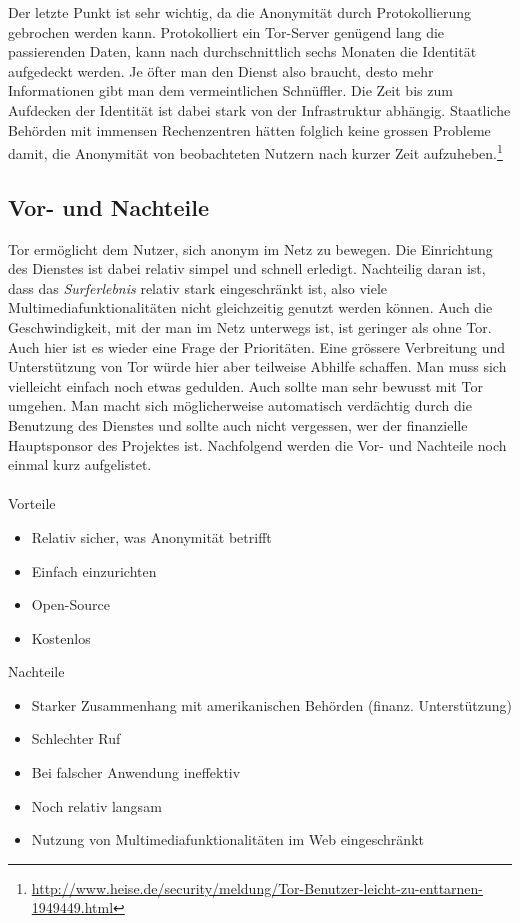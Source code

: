 Der letzte Punkt ist sehr wichtig, da die Anonymität durch Protokollierung gebrochen werden kann. Protokolliert ein Tor-Server genügend lang die passierenden Daten, kann nach durchschnittlich sechs Monaten die Identität aufgedeckt werden. Je öfter man den Dienst also braucht, desto mehr Informationen gibt man dem vermeintlichen Schnüffler. Die Zeit bis zum Aufdecken der Identität ist dabei stark von der Infrastruktur abhängig. Staatliche Behörden mit immensen Rechenzentren hätten folglich keine grossen Probleme damit, die Anonymität von beobachteten Nutzern nach kurzer Zeit aufzuheben.\footnote{\url{http://www.heise.de/security/meldung/Tor-Benutzer-leicht-zu-enttarnen-1949449.html}}

\subsection{Vor- und Nachteile}
Tor ermöglicht dem Nutzer, sich anonym im Netz zu bewegen. Die Einrichtung des Dienstes ist dabei relativ simpel und schnell erledigt. Nachteilig daran ist, dass das \textit{Surferlebnis} relativ stark eingeschränkt ist, also viele Multimediafunktionalitäten nicht gleichzeitig genutzt werden können. Auch die Geschwindigkeit, mit der man im Netz unterwegs ist, ist geringer als ohne Tor. Auch hier ist es wieder eine Frage der Prioritäten. Eine grössere Verbreitung und Unterstützung von Tor würde hier aber teilweise Abhilfe schaffen. Man muss sich vielleicht einfach noch etwas gedulden. Auch sollte man sehr bewusst mit Tor umgehen. Man macht sich möglicherweise automatisch verdächtig durch die Benutzung des Dienstes und sollte auch nicht vergessen, wer der finanzielle Hauptsponsor des Projektes ist.
Nachfolgend werden die Vor- und Nachteile noch einmal kurz aufgelistet.
\\
\\
Vorteile
\begin{itemize}
\item Relativ sicher, was Anonymität betrifft
\item Einfach einzurichten
\item Open-Source
\item Kostenlos
\end{itemize}

Nachteile
\begin{itemize}
\item Starker Zusammenhang mit amerikanischen Behörden (finanz. Unterstützung)
\item Schlechter Ruf
\item Bei falscher Anwendung ineffektiv
\item Noch relativ langsam
\item Nutzung von Multimediafunktionalitäten im Web eingeschränkt
\end{itemize}

